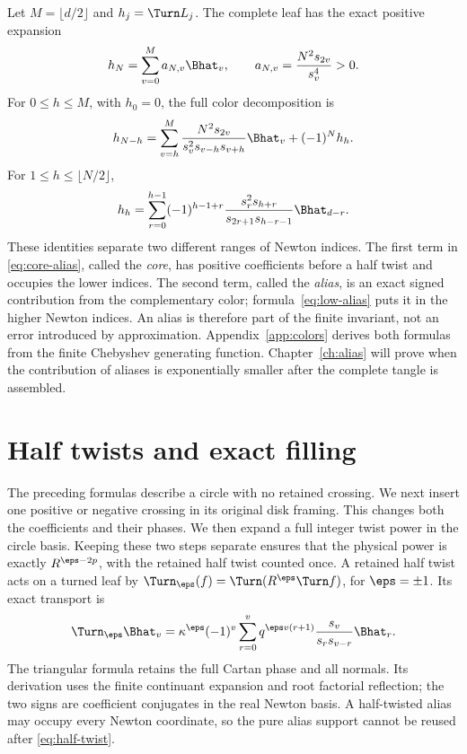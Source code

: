 Let $M=\lfloor d/2\rfloor$ and $h_j=\Turn L_j$. The complete leaf has the exact positive expansion
\begin{equation}\label{eq:complete-leaf}
 h_N=\sum_{v=0}^{M}a_{N,v}\Bhat_v,
 \qquad a_{N,v}=\frac{N^2s_{2v}}{s_v^4}>0.
\end{equation}
For $0\le h\le M$, with $h_0=0$, the full color decomposition is
\begin{equation}\label{eq:core-alias}
 h_{N-h}=\sum_{v=h}^{M}
 \frac{N^2s_{2v}}{s_v^2s_{v-h}s_{v+h}}\Bhat_v+(-1)^Nh_h.
\end{equation}
For $1\le h\le\lfloor N/2\rfloor$,
\begin{equation}\label{eq:low-alias}
 h_h=\sum_{r=0}^{h-1}(-1)^{h-1+r}
 \frac{s_r^2s_{h+r}}{s_{2r+1}s_{h-r-1}}\Bhat_{d-r}.
\end{equation}
These identities separate two different ranges of Newton indices. The first term in \eqref{eq:core-alias}, called the \emph{core}, has positive coefficients before a half twist and occupies the lower indices. The second term, called the \emph{alias}, is an exact signed contribution from the complementary color; formula~\eqref{eq:low-alias} puts it in the higher Newton indices. An alias is therefore part of the finite invariant, not an error introduced by approximation. Appendix~\ref{app:colors} derives both formulas from the finite Chebyshev generating function. Chapter~\ref{ch:alias} will prove when the contribution of aliases is exponentially smaller after the complete tangle is assembled.

\section{Half twists and exact filling}

The preceding formulas describe a circle with no retained crossing. We next insert one positive or negative crossing in its original disk framing. This changes both the coefficients and their phases. We then expand a full integer twist power in the circle basis. Keeping these two steps separate ensures that the physical power is exactly $R^{\eps-2p}$, with the retained half twist counted once.
A retained half twist acts on a turned leaf by
$\Turn_\eps(f)=\Turn(R^\eps\Turn f)$, for $\eps=\pm1$. Its exact transport is
\begin{equation}\label{eq:half-twist}
 \Turn_\eps\Bhat_v=\kappa^\eps(-1)^v
 \sum_{r=0}^{v}q^{\eps v(r+1)}
 \frac{s_v}{s_rs_{v-r}}\Bhat_r.
\end{equation}
The triangular formula retains the full Cartan phase and all normals. Its derivation uses the finite continuant expansion and root factorial reflection; the two signs are coefficient conjugates in the real Newton basis. A half-twisted alias may occupy every Newton coordinate, so the pure alias support cannot be reused after \eqref{eq:half-twist}.

